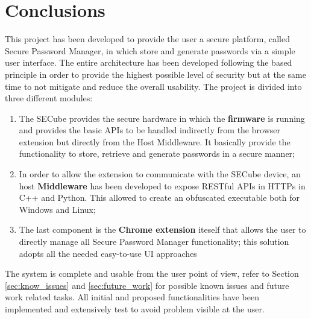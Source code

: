 \chapter{Conclusions}
\label{sec:conclusions}

This project has been developed to provide the user a secure platform, called Secure Password Manager, in which store and generate passwords via a simple user interface. The entire architecture has been developed following the based principle in order to provide the highest possible level of security but at the same time to not mitigate and reduce the overall usability.\newline\newline
The project is divided into three different modules:
\begin{enumerate}
	\item The SECube provides the secure hardware in which the \textbf{firmware} is running and provides the basic APIs to be handled indirectly from the browser extension but directly from the Host Middleware. It basically provide the functionality to store, retrieve and generate passwords in a secure manner;
	\item In order to allow the extension to communicate with the SECube device, an host \textbf{Middleware} has been developed to expose RESTful APIs in HTTPs in C++ and Python. This allowed to create an obfuscated executable both for Windows and Linux;
	\item The last component is the \textbf{Chrome extension} iteself that allows the user to directly manage all Secure Password Manager functionality; this solution adopts all the needed easy-to-use UI approaches
\end{enumerate}
The system is complete and usable from the user point of view, refer to Section \ref{sec:know_issues} and \ref{sec:future_work} for possible known issues and future work related tasks. All initial and proposed functionalities have been implemented and extensively test to avoid problem visible at the user. 

